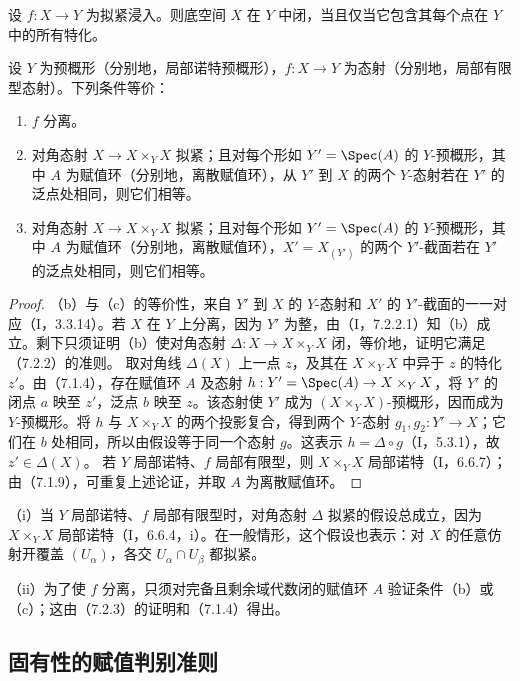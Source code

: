设 $f:X\to Y$ 为拟紧浸入。则底空间 $X$ 在 $Y$ 中闭，当且仅当它包含其每个点在 $Y$ 中的所有特化。

设 $Y$ 为预概形（分别地，局部诺特预概形），$f:X\to Y$ 为态射（分别地，局部有限型态射）。下列条件等价：
\begin{enumerate}[label=\alph*)]
\item $f$ 分离。
\item 对角态射 $X\to X\times_Y X$ 拟紧；且对每个形如 $Y'=\Spec(A)$ 的 $Y$-预概形，其中 $A$ 为赋值环（分别地，离散赋值环），从 $Y'$ 到 $X$ 的两个 $Y$-态射若在 $Y'$ 的泛点处相同，则它们相等。
\item 对角态射 $X\to X\times_Y X$ 拟紧；且对每个形如 $Y'=\Spec(A)$ 的 $Y$-预概形，其中 $A$ 为赋值环（分别地，离散赋值环），$X'=X_{(Y')}$ 的两个 $Y'$-截面若在 $Y'$ 的泛点处相同，则它们相等。
\end{enumerate}
\begin{proof}
（b）与（c）的等价性，来自 $Y'$ 到 $X$ 的 $Y$-态射和 $X'$ 的 $Y'$-截面的一一对应（I，3.3.14）。若 $X$ 在 $Y$ 上分离，因为 $Y'$ 为整，由（I，7.2.2.1）知（b）成立。剩下只须证明（b）使对角态射 $\Delta:X\to X\times_Y X$ 闭，等价地，证明它满足（7.2.2）的准则。
取对角线 $\Delta(X)$ 上一点 $z$，及其在 $X\times_Y X$ 中异于 $z$ 的特化 $z'$。由（7.1.4），存在赋值环 $A$ 及态射 $h:Y'=\Spec(A)\to X\times_Y X$，将 $Y'$ 的闭点 $a$ 映至 $z'$，泛点 $b$ 映至 $z$。该态射使 $Y'$ 成为 $(X\times_Y X)$-预概形，因而成为 $Y$-预概形。将 $h$ 与 $X\times_Y X$ 的两个投影复合，得到两个 $Y$-态射 $g_1,g_2:Y'\to X$；它们在 $b$ 处相同，所以由假设等于同一个态射 $g$。这表示 $h=\Delta\circ g$（I，5.3.1），故 $z'\in\Delta(X)$。
若 $Y$ 局部诺特、$f$ 局部有限型，则 $X\times_Y X$ 局部诺特（I，6.6.7）；由（7.1.9），可重复上述论证，并取 $A$ 为离散赋值环。
\end{proof}

（i）当 $Y$ 局部诺特、$f$ 局部有限型时，对角态射 $\Delta$ 拟紧的假设总成立，因为 $X\times_Y X$ 局部诺特（I，6.6.4，i）。在一般情形，这个假设也表示：对 $X$ 的任意仿射开覆盖 $(U_\alpha)$，各交 $U_\alpha\cap U_\beta$ 都拟紧。

（ii）为了使 $f$ 分离，只须对完备且剩余域代数闭的赋值环 $A$ 验证条件（b）或（c）；这由（7.2.3）的证明和（7.1.4）得出。

\subsection{固有性的赋值判别准则}

